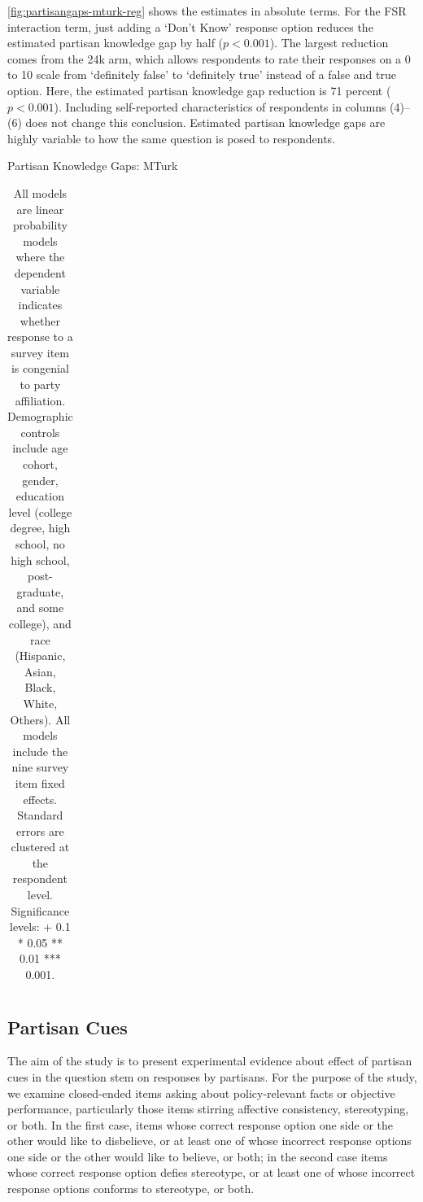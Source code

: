 \documentclass[12pt, letterpaper]{article}
\begin{document}
\cref{fig:partisangaps-mturk-reg} shows the estimates in absolute terms.
For the FSR interaction term, just adding a `Don't Know' response option reduces the estimated partisan knowledge gap by half ($p<0.001$).
The largest reduction comes from the 24k arm, which allows respondents to rate their responses on a 0 to 10 scale from `definitely false' to `definitely true' instead of a false and true option. Here, the estimated partisan knowledge gap reduction is 71 percent ($p<0.001$). Including self-reported characteristics of respondents in columns (4)--(6) does not change this conclusion. Estimated partisan knowledge gaps are highly variable to how the same question is posed to respondents.

\begin{table}[t] \centering \small \setlength\tabcolsep{0 pt} \setlength{\defaultaddspace}{0pt}
	\def\sym#1{\ifmmode^{#1}\else\(^{#1}\)\fi}
	\caption{Partisan Knowledge Gaps: MTurk}
	\label{tab:partisangaps-mturk}
	\begin{adjustbox}{max width=\textwidth}
		\begin{tabular}{l*{6}{D{.}{.}{-1}}}
			\toprule
			
			\bottomrule
		\end{tabular}
	\end{adjustbox}
	\caption*{\footnotesize All models are linear probability models where the dependent variable indicates whether response to a survey item is congenial to party affiliation. Demographic controls include age cohort, gender, education level (college degree, high school, no high school, post-graduate, and some college), and race (Hispanic, Asian, Black, White, Others). All models include the nine survey item fixed effects. Standard errors are clustered at the respondent level. Significance levels: + 0.1 * 0.05 ** 0.01 *** 0.001.}
\end{table}

\subsection{Partisan Cues}\label{subsec:partisan-cues}
The aim of the study is to present experimental evidence about effect of partisan cues in the question stem on responses by partisans. For the purpose of the study, we examine closed-ended items asking about policy-relevant facts or objective performance, particularly those items stirring affective consistency, stereotyping, or both.  In the first case, items whose correct response option one side or the other would like to disbelieve, or at least one of whose incorrect response options one side or the other would like to believe, or both; in the second case items whose correct response option defies stereotype, or at least one of whose incorrect response options conforms to stereotype, or both.  
\end{document}
